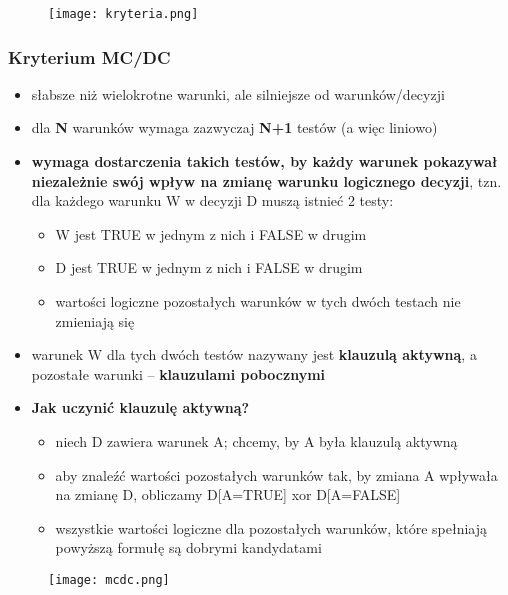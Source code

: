 \documentclass[../main.tex]{subfiles}
\begin{document}
    \begin{figure}[H]
        \texttt{[image: kryteria.png]}
    \end{figure}

    \subsubsection{Kryterium MC/DC}

    \begin{itemize}
        \item słabsze niż wielokrotne warunki, ale silniejsze od warunków/decyzji
        \item dla \textbf{N} warunków wymaga zazwyczaj \textbf{N+1} testów (a więc liniowo)
        \item \textbf{wymaga dostarczenia takich testów, by każdy warunek pokazywał niezależnie swój wpływ na zmianę warunku
        logicznego decyzji}, tzn. dla każdego warunku W w decyzji D muszą istnieć 2 testy:
        \begin{itemize}
            \item W jest TRUE w jednym z nich i FALSE w drugim
            \item D jest TRUE w jednym z nich i FALSE w drugim
            \item wartości logiczne pozostałych warunków w tych dwóch testach
            nie zmieniają się
        \end{itemize}
        \item warunek W dla tych dwóch testów nazywany jest \textbf{klauzulą aktywną},
        a pozostałe warunki – \textbf{klauzulami pobocznymi}
        \item \textbf{Jak uczynić klauzulę aktywną?}
        \begin{itemize}
            \item niech D zawiera warunek A; chcemy, by A była klauzulą aktywną
            \item aby znaleźć wartości pozostałych warunków tak, by zmiana A wpływała
            na zmianę D, obliczamy D[A=TRUE] xor D[A=FALSE]
            \item wszystkie wartości logiczne dla pozostałych warunków, które spełniają
            powyższą formułę są dobrymi kandydatami
        \end{itemize}
    \end{itemize}

    \begin{figure}[H]
        \texttt{[image: mcdc.png]}
    \end{figure}
\end{document}
